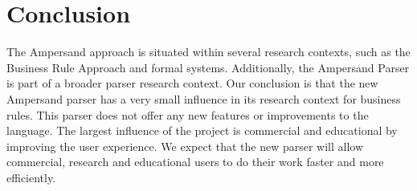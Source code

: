
\section{Conclusion}
\label{sec:conclusion}
The Ampersand approach is situated within several research contexts, such as the Business Rule Approach and formal systems.
Additionally, the Ampersand Parser is part of a broader parser research context.
Our conclusion is that the new Ampersand parser has a very small influence in its research context for business rules.
This parser does not offer any new features or improvements to the language.
The largest influence of the project is commercial and educational by improving the user experience.
We expect that the new parser will allow commercial, research and educational users to do their work faster and more efficiently.

